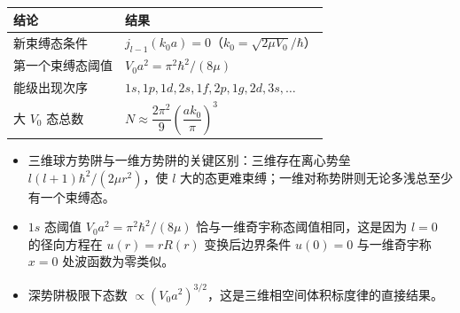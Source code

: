 \begin{formulabox}[答案汇总]
\begin{center}
\begin{tabular}{ll}
\toprule
\textbf{结论} & \textbf{结果} \\
\midrule
新束缚态条件 & $j_{l-1}(k_0a)=0$（$k_0=\sqrt{2\mu V_0}/\hbar$） \\
第一个束缚态阈值 & $V_0a^2=\pi^2\hbar^2/(8\mu)$ \\
能级出现次序 & $1s,1p,1d,2s,1f,2p,1g,2d,3s,\ldots$ \\
大 $V_0$ 态总数 & $N\approx\dfrac{2\pi^2}{9}\left(\dfrac{ak_0}{\pi}\right)^3$ \\
\bottomrule
\end{tabular}
\end{center}
\end{formulabox}

\begin{insightbox}[物理图像]
\begin{itemize}
    \item 三维球方势阱与一维方势阱的关键区别：三维存在离心势垒 $l(l+1)\hbar^2/(2\mu r^2)$，使 $l$ 大的态更难束缚；一维对称势阱则无论多浅总至少有一个束缚态。
    \item $1s$ 态阈值 $V_0a^2=\pi^2\hbar^2/(8\mu)$ 恰与一维奇宇称态阈值相同，这是因为 $l=0$ 的径向方程在 $u(r)=rR(r)$ 变换后边界条件 $u(0)=0$ 与一维奇宇称 $x=0$ 处波函数为零类似。
    \item 深势阱极限下态数 $\propto(V_0a^2)^{3/2}$，这是三维相空间体积标度律的直接结果。
\end{itemize}
\end{insightbox}
